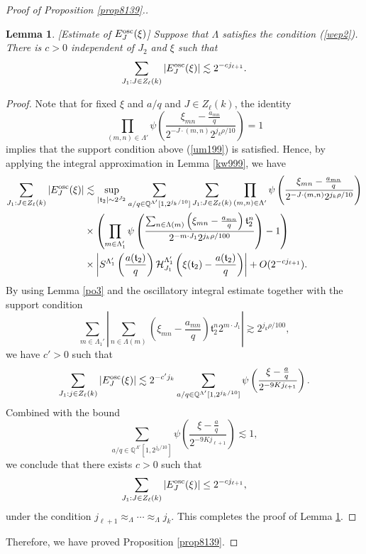 \documentclass[11 pt,letterpaper]{amsart}
\theoremstyle{plain}
\newtheorem{lemma}{Lemma}\numberwithin{lemma}{section}
\theoremstyle{definition}
\theoremstyle{remark} \theoremstyle{exam} \theoremstyle{ob}
\numberwithin{equation}{section}
\begin{document}
\begin{proof}[Proof of Proposition \ref{prop8139}.]
\begin{lemma}\label{lem574b9}[Estimate of $E^{\rm{osc}}_J(\xi)$] Suppose that $\Lambda$ satisfies   the  condition (\ref{wep2}). There is $c>0$ independent of $J_2$ and $\xi$ such that
$$\sum_{J_1:J\in Z_\ell(k)} |E^{\rm{osc}}_J(\xi)|\lesssim 2^{-cj_{\ell+1}}.$$
\end{lemma}
\begin{proof}  
 Note that for fixed $\xi$ and $a/q$ and $J\in Z_\ell(k)$, the identity $$\prod_{(m,n)\in \Lambda'} \psi\left(  \frac{  \xi_{mn}-\frac{a_{mn}}{q}}{ 2^{-J\cdot (m,n)}2^{j_k\rho/10}} \right)=1$$ implies that the support condition above  (\ref{um199}) is satisfied.
Hence, by applying  the integral approximation in Lemma \ref{kw999}, we have
\begin{align*} 
\sum_{J_1:J\in Z_{\ell}(k)} |E^{\rm{osc}}_{J}(\xi)| &\lesssim \sup_{|\mathfrak{t}_2|\sim 2^{J_2}} \sum_{ a/q\in \mathbb{Q}^{\Lambda'}[1,2^{j_k/10}]} \sum_{J_1:J\in Z_{\ell}(k)}       \prod_{(m,n)\in \Lambda'} \psi\left(  \frac{  \xi_{mn}-\frac{a_{mn}}{q}}{ 2^{-J\cdot (m,n)}2^{j_k\rho/10}} \right)  \nonumber \\
&\times \left(  \prod_{m\in\Lambda'_{1}}\psi\left( \frac{\sum_{n\in\Lambda(m)}\left( \xi_{mn}-\frac{a_{mn}}{q} \right)\mathfrak{t}_2^n }{2^{-m\cdot J_1} 2^{ j_k\rho/100}} \right) -1\right)\\
&\times \left|S^{\Lambda_{1}'}\left(\frac{a(\mathfrak{t}_2)}{q}\right)  \mathcal{H}^{\Lambda_{1}'}_{J_{1}}\left(\xi(\mathfrak{t}_2)-\frac{a(\mathfrak{t}_2)}{q}\right)\right| +O(2^{-cj_{\ell+1}}).\nonumber
\end{align*}
 By  using Lemma \ref{po3}  and the    oscillatory integral estimate together with   the support condition 
 $$ \sum_{m\in \Lambda_1'} \left|  \sum_{n\in\Lambda(m)}\left( \xi_{mn}-\frac{a_{mn}}{q} \right)\mathfrak{t}_2^n 2^{m\cdot J_1}    \right|\gtrsim  2^{ j_k\rho/100},$$ we have $c'>0$ such that $$ \sum_{J_1:j\in Z_{\ell}(k)} |E^{\rm{osc}}_{J}(\xi)|\lesssim 2^{-c'j_{k}}  \sum_{ a/q\in \mathbb{Q}^{\Lambda'}[1,2^{j_k/10}]}  \psi\left(\frac{\xi-\frac{a}{q}}{2^{-9Kj_{\ell+1}}}\right).$$    Combined with the bound $$ \sum_{ a/q\in \mathbb{Q}^{\Lambda'}[1,2^{j_k/10}]}  \psi\left(\frac{\xi-\frac{a}{q}}{2^{-9Kj_{\ell+1}}}\right)\lesssim 1,$$ we conclude that there exists $c>0$ such that
\begin{align*} 
\sum_{J_1:J\in Z_{\ell}(k)} |E^{\rm{osc}}_{J}(\xi)| \le 2^{-cj_{\ell+1}},
\end{align*}
under the condition $j_{\ell+1}\approx_{\Lambda}\cdots\approx_{\Lambda} j_k$.
This completes the proof of Lemma \ref{lem574b9}.
\end{proof}
Therefore, we have proved Proposition \ref{prop8139}.
\end{proof}
\end{document}
